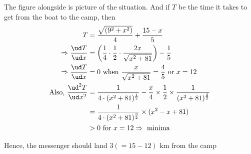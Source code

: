 \begin{solution}
   The figure alongside is picture of the situation. And if $T$ be the time it 
   takes to get from the boat to the camp, then 
   \begin{align}
       T &= \dfrac{\sqrt{(9^2+x^2)}}{4} + \dfrac{15-x}{5} \\
       \Rightarrow \dfrac{\ud T}{\ud x} &= \left( \dfrac{1}{4}\cdot\dfrac{1}{2}\cdot\dfrac{2x}{\sqrt{x^2+81}}\right) - \dfrac{1}{5} \\
       \Rightarrow \dfrac{\ud T}{\ud x} &= 0\text{ when } \dfrac{x}{\sqrt{x^2+81}} = \dfrac{4}{5}
       \text{ or } x = 12 \\
       \text{Also, }\dfrac{\ud^2 T}{\ud x^2} &= \dfrac{1}{4\cdot(x^2+81)^{\frac{1}{2}}} 
                         - \dfrac{x}{4}\times\dfrac{1}{2}\times\dfrac{1}{(x^2+81)^{\frac{3}{2}}} \\
                         &= \dfrac{1}{4\cdot(x^2+81)^{\frac{3}{2}}}\times(x^2-x+81) \\
                         &> 0 \text{ for } x = 12 \Rightarrow \text{ minima }
   \end{align}
   
   Hence, the messenger should land $3(= 15 -12)$ km from the camp
\end{solution}
